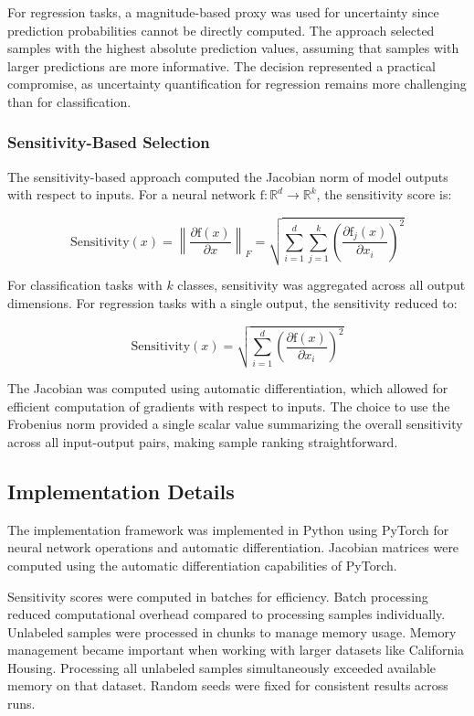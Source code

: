 \documentclass[conference]{IEEEtran}
\newcommand{\func}[1]{\mathrm{#1}} %
\begin{document}
For regression tasks, a magnitude-based proxy was used for uncertainty since prediction probabilities cannot be directly computed. The approach selected samples with the highest absolute prediction values, assuming that samples with larger predictions are more informative. The decision represented a practical compromise, as uncertainty quantification for regression remains more challenging than for classification.

\subsubsection{Sensitivity-Based Selection}

The sensitivity-based approach computed the Jacobian norm of model outputs with respect to inputs. For a neural network $\func{f}: \mathbb{R}^d \rightarrow \mathbb{R}^k$, the sensitivity score is:

\begin{equation}
\text{Sensitivity}(x) = \left\|\frac{\partial \func{f}(x)}{\partial x}\right\|_F = \sqrt{\sum_{i=1}^d \sum_{j=1}^k \left(\frac{\partial \func{f}_j(x)}{\partial x_i}\right)^2}
\end{equation}

For classification tasks with $k$ classes, sensitivity was aggregated across all output dimensions. For regression tasks with a single output, the sensitivity reduced to:

\begin{equation}
\text{Sensitivity}(x) = \sqrt{\sum_{i=1}^d \left(\frac{\partial \func{f}(x)}{\partial x_i}\right)^2}
\end{equation}

The Jacobian was computed using automatic differentiation, which allowed for efficient computation of gradients with respect to inputs. The choice to use the Frobenius norm provided a single scalar value summarizing the overall sensitivity across all input-output pairs, making sample ranking straightforward.

\subsection{Implementation Details}

The implementation framework was implemented in Python using PyTorch for neural network operations and automatic differentiation. Jacobian matrices were computed using the automatic differentiation capabilities of PyTorch.

Sensitivity scores were computed in batches for efficiency. Batch processing reduced computational overhead compared to processing samples individually. Unlabeled samples were processed in chunks to manage memory usage. Memory management became important when working with larger datasets like California Housing. Processing all unlabeled samples simultaneously exceeded available memory on that dataset. Random seeds were fixed for consistent results across runs.
\end{document}
